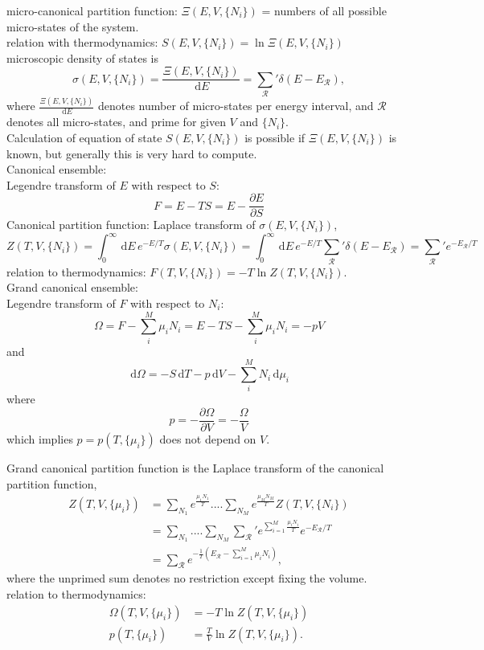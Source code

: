 \documentclass{article}
\newcommand{\be}{\begin{equation}}
\newcommand{\ee}{\end{equation}}
\newcommand{\bs}{\be\begin{split}}
\newcommand{\dif}{\,\mathrm{d}}
\newcommand{\p}{\partial}
\newcommand{\1}{\left}
\newcommand{\2}{\right}
\newcommand{\ma}{\mathcal}
\newcommand{\m}{\mu}
\newcommand{\sig}{\sigma}
\newcommand{\del}{\delta}
\begin{document}
micro-canonical partition function: $\Xi(E,V,\{N_i\})$ = numbers of all possible micro-states of the system.\\
relation with thermodynamics: $S(E,V,\{N_i\})=\ln\Xi(E,V,\{N_i\})$\\
microscopic density of states is
\be
\sig(E,V,\{N_i\})=\frac{\Xi(E,V,\{N_i\})}{\dif E}=\sum_{\ma R}\nolimits'\del(E-E_{\ma R}),
\ee
where $\frac{\Xi(E,V,\{N_i\})}{\dif E}$ denotes number of micro-states per energy interval, and $\ma R$ denotes all micro-states, and prime for given $V$ and $\{N_i\}$.\\
Calculation of equation of state $S(E,V,\{N_i\})$ is possible if $\Xi(E,V,\{N_i\})$ is known, but generally this is very hard to compute.\\

Canonical ensemble:\\
Legendre transform of $E$ with respect to $S$: 
\be
F=E-TS=E-\frac{\p E}{\p S}
\ee
Canonical partition function: Laplace transform of $\sig(E,V,\{N_i\})$,
\be
Z(T,V,\{N_i\})=\int_0^\infty \dif E \, e^{-E/T} \sig(E,V,\{N_i\})=\int_0^\infty \dif E \, e^{-E/T}\sum_{\ma R}\nolimits'\del(E-E_{\ma R})=\sum_{\ma R}\nolimits'e^{-E_{\ma R}/T}
\ee
relation to thermodynamics: $F(T,V,\{N_i\})=-T\ln Z(T,V,\{N_i\})$.\\

Grand canonical ensemble:\\
Legendre transform of $F$ with respect to $N_i$: 
\be
\Omega=F-\sum_i^M \m_i N_i=E-TS-\sum_i^M \m_i N_i=-pV
\ee
and
\be
\dif \Omega=-S\dif T-p\dif V-\sum_i^M N_i\dif\m_i
\ee
where 
\be 
p=-\frac{\p\Omega}{\p V}=-\frac{\Omega}{V} 
\ee
which implies $p=p(T,\{\m_i\})$ does not depend on $V$.

Grand canonical partition function is the Laplace transform of the canonical partition function,
\bs
Z(T,V,\{\m_i\})&=\sum_{N_1} e^{\frac{\m_1 N_1}{T}}....\sum_{N_M} e^{\frac{\m_M N_M}{T}} Z(T,V,\{N_i\})\\
&=\sum_{N_1}....\sum_{N_M}\sum_{\ma R}\nolimits'e^{\sum\limits_{i=1}^M\frac {\m_iN_i} T}e^{-E_{\ma R}/T}\\
&=\sum\nolimits_{\ma R}e^{-\frac 1 T(E_{\ma R}-\sum\limits_{i=1}^M\m_iN_i)},
\end{split}\ee
where the unprimed sum denotes no restriction except fixing the volume.\\
relation to thermodynamics: 
\bs
\Omega(T,V,\{\m_i\})&=-T\ln Z(T,V,\{\m_i\})\\
p(T,\{\m_i\})&=\frac T V\ln Z(T,V,\{\m_i\}).
\end{split}\ee
\end{document}
